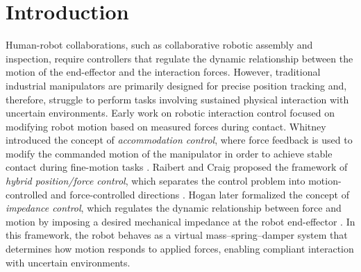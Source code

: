 \documentclass[journal]{IEEEtran}
\begin{document}
%
\IEEEpeerreviewmaketitle


\section{Introduction}
Human-robot collaborations, such as collaborative robotic assembly and inspection, require controllers that regulate the dynamic relationship between the motion of the end-effector and the interaction forces.
However, traditional industrial manipulators are primarily designed for precise position tracking and, therefore, struggle to perform tasks involving sustained physical interaction with uncertain environments. 
Early work on robotic interaction control focused on modifying robot motion based on measured forces during contact. Whitney introduced the concept of \emph{accommodation control}, where force feedback is used to modify the commanded motion of the manipulator in order to achieve stable contact during fine-motion tasks \cite{Whitney1977}. 
Raibert and Craig proposed the framework of \emph{hybrid position/force control}, which separates the control problem into motion-controlled and force-controlled directions \cite{RaibertCraig1981}. 
Hogan later formalized the concept of \emph{impedance control}, which regulates the dynamic relationship between force and motion by imposing a desired mechanical impedance at the robot end-effector \cite{Hogan1985}. In this framework, the robot behaves as a virtual mass–spring–damper system that determines how motion responds to applied forces, enabling compliant interaction with uncertain environments.
\end{document}
